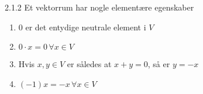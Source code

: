 \begin{saetning}{2.1.2}
Et vektorrum har nogle elementære egenskaber
\begin{enumerate}
		\renewcommand{\theenumi}{\Roman{enumi}}
		\renewcommand{\labelenumi}{\textbf{(\theenumi)}}
	\item 0 er det entydige neutrale element i $V$
	\item $0\cdot x=0 \, \forall x \in V$
	\item Hvis $x,y\in V$ er således at $x+y=0$, så er $y=-x$
	\item $(-1)x = -x \, \forall x\in V$
\end{enumerate}
\end{saetning}
